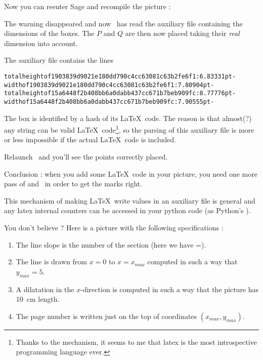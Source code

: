 Now you can reenter Sage and recompile the picture :



The warning disappeared and now \phystricks\ has read the auxiliary file containing the dimensions of the boxes. The \( P\) and \( Q\) are then now placed taking their \emph{real} dimension into account.

The auxiliary file contains the lines
\begin{verbatim}
totalheightof1903839d9021e180dd790c4cc63081c63b2fe6f1:6.83331pt-
widthof1903839d9021e180dd790c4cc63081c63b2fe6f1:7.80904pt-
totalheightof15a6448f2b408bb6a0dabb437cc671b7beb909fc:8.77776pt-
widthof15a6448f2b408bb6a0dabb437cc671b7beb909fc:7.90555pt-
\end{verbatim}

The box is identified by a hash of its \LaTeX\ code. The reason is that almost(?) any string can be valid \LaTeX\ code\footnote{Thanks to the  mechanism, it seems to me that latex is the most introspective programming language ever.}, so the parsing of this auxiliary file is more or less impossible if the actual \LaTeX\ code is included.

Relaunch \pdfLaTeX\ and you'll see the points correctly placed.

Conclusion : when you add some \LaTeX\ code in your picture, you need one more pass of \pdfLaTeX and \phystricks\ in order to get the marks right.

This mechanism of making \LaTeX\ write values in an auxiliary file is general and any latex internal counters can be accessed in your python code (as Python's ).

You don't believe ? Here is a picture with the following specifications :
\begin{enumerate}
    \item
        The line slope is the number of the section (here we have \info{\thesection}=\thesection).
\item
The line is drawn from \( x=0\) to \( x=x_{max}\) computed in such a way that \( y_{max}=5\). 
\item
A dilatation in the \( x\)-direction is computed in such a way that the picture has \SI{10}{\centi\meter} length.
\item
    The page number is written just on the top of coordinates \( (x_{max},y_{max})\).
\end{enumerate}

\begin{center}
   
\end{center}

